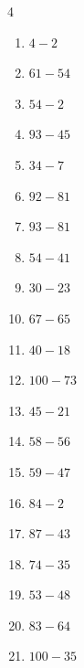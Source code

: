 \begin{multicols}{4}
\begin{enumerate}
  \item $4-2$
        \phantom{$=2$}

  \item $61-54$
        \phantom{$=7$}

\columnbreak %

\resetques

  \item $54-2$
        \phantom{$=52$}

  \item $93-45$
        \phantom{$=48$}

  \item $34-7$
        \phantom{$=27$}

  \item $92-81$
        \phantom{$=11$}

  \item $93-81$
        \phantom{$=12$}

  \item $54-41$
        \phantom{$=13$}

  \item $30-23$
        \phantom{$=7$}

  \item $67-65$
        \phantom{$=2$}

  \item $40-18$
        \phantom{$=22$}

  \item $100-73$
        \phantom{$=27$}

  \item $45-21$
        \phantom{$=24$}

  \item $58-56$
        \phantom{$=2$}

  \item $59-47$
        \phantom{$=12$}

  \item $84-2$
        \phantom{$=82$}

  \item $87-43$
        \phantom{$=44$}

  \item $74-35$
        \phantom{$=39$}

  \item $53-48$
        \phantom{$=5$}

  \item $83-64$
        \phantom{$=19$}

  \item $100-35$
        \phantom{$=65$}


\end{enumerate}
\end{multicols}
